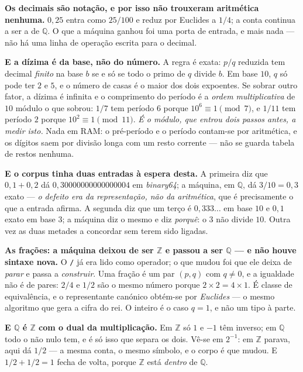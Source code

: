\documentclass[11pt]{article}
\newcommand{\code}[1]{\texttt{\small #1}}
\theoremstyle{plain}
\theoremstyle{remark}
\begin{document}
\begin{itemize}
\textbf{Os decimais são notação, e por isso não trouxeram aritmética nenhuma.} $0{,}25$ entra
como $25/100$ e reduz por Euclides a $1/4$; a conta continua a ser a de $\mathbb{Q}$. O que a
máquina ganhou foi uma porta de entrada, e mais nada --- não há uma linha de operação escrita
para o decimal.

\textbf{E a dízima é da base, não do número.} A regra é exata: $p/q$ reduzida tem decimal
\emph{finito} na base $b$ se e só se todo o primo de $q$ divide $b$. Em base $10$, $q$ só pode ter
$2$ e $5$, e o número de casas é o maior dos dois expoentes. Se sobrar outro fator, a dízima é
infinita e o comprimento do período é a \emph{ordem multiplicativa} de $10$ módulo o que sobrou:
$1/7$ tem período $6$ porque $10^6 \equiv 1 \pmod 7$, e $1/11$ tem período $2$ porque
$10^2 \equiv 1 \pmod{11}$. \emph{É o módulo, que entrou dois passos antes, a medir isto.} Nada em
RAM: o pré-período e o período contam-se por aritmética, e os dígitos saem por divisão longa com
um resto corrente --- não se guarda tabela de restos nenhuma.

\textbf{E o corpus tinha duas entradas à espera desta.} A primeira diz que $0{,}1 + 0{,}2$ dá
$0{,}30000000000000004$ em \emph{binary64}; a máquina, em $\mathbb{Q}$, dá $3/10 = 0{,}3$ exato ---
\emph{o defeito era da representação, não da aritmética}, que é precisamente o que a entrada
afirma. A segunda diz que um terço é $0{,}333\ldots$ em base $10$ e $0{,}1$ exato em base $3$; a
máquina diz o mesmo e diz \emph{porquê}: o $3$ não divide $10$. Outra vez as duas metades a
concordar sem terem sido ligadas.

\textbf{As frações: a máquina deixou de ser $\mathbb{Z}$ e passou a ser $\mathbb{Q}$ --- e não
houve sintaxe nova.} O \code{/} já era lido como operador; o que mudou foi que ele deixa de
\emph{parar} e passa a \emph{construir}. Uma fração é um par $(p,q)$ com $q \neq 0$, e a igualdade
não é de pares: $2/4$ e $1/2$ são o mesmo número porque $2\times 2 = 4\times 1$. É classe de
equivalência, e o representante canónico obtém-se por \emph{Euclides} --- o mesmo algoritmo que
gera a cifra do rei. O inteiro é o caso $q = 1$, e não um tipo à parte.

\textbf{E $\mathbb{Q}$ é $\mathbb{Z}$ com o dual da multiplicação.} Em $\mathbb{Z}$ só $1$ e $-1$
têm inverso; em $\mathbb{Q}$ todo o não nulo tem, e é só isso que separa os dois. Vê-se em
$2^{-1}$: em $\mathbb{Z}$ parava, aqui dá $1/2$ --- a mesma conta, o mesmo símbolo, e o corpo é que
mudou. E $1/2 + 1/2 = 1$ fecha de volta, porque $\mathbb{Z}$ está \emph{dentro} de $\mathbb{Q}$.


\end{itemize}
\end{document}
